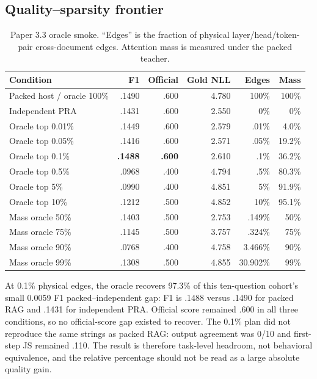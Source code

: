\documentclass[11pt]{article}
\begin{document}
\subsection{Quality--sparsity frontier}

\begin{table}[ht]
\centering
\small
\caption{Paper 3.3 oracle smoke. ``Edges'' is the fraction of physical
layer/head/token-pair cross-document edges. Attention mass is measured under
the packed teacher.}
\label{tab:oracle-frontier}
\begin{tabular}{lrrrrr}
\toprule
Condition & F1 & Official & Gold NLL & Edges & Mass \\
\midrule
Packed host / oracle 100\% & .1490 & .600 & 4.780 & 100\% & 100\% \\
Independent PRA & .1431 & .600 & 2.550 & 0\% & 0\% \\
Oracle top 0.01\% & .1449 & .600 & 2.579 & .01\% & 4.0\% \\
Oracle top 0.05\% & .1416 & .600 & 2.571 & .05\% & 19.2\% \\
Oracle top 0.1\% & \textbf{.1488} & \textbf{.600} & 2.610 & .1\% & 36.2\% \\
Oracle top 0.5\% & .0968 & .400 & 4.794 & .5\% & 80.3\% \\
Oracle top 5\% & .0990 & .400 & 4.851 & 5\% & 91.9\% \\
Oracle top 10\% & .1212 & .500 & 4.852 & 10\% & 95.1\% \\
\midrule
Mass oracle 50\% & .1403 & .500 & 2.753 & .149\% & 50\% \\
Mass oracle 75\% & .1145 & .500 & 3.757 & .324\% & 75\% \\
Mass oracle 90\% & .0768 & .400 & 4.758 & 3.466\% & 90\% \\
Mass oracle 99\% & .1308 & .500 & 4.855 & 30.902\% & 99\% \\
\bottomrule
\end{tabular}
\end{table}

At 0.1\% physical edges, the oracle recovers 97.3\% of this ten-question
cohort's small 0.0059 F1 packed--independent gap: F1 is .1488 versus .1490 for
packed RAG and .1431 for independent PRA. Official score remained .600 in all
three conditions, so no official-score gap existed to recover. The 0.1\% plan
did not reproduce the same strings as packed RAG: output agreement was 0/10 and
first-step JS remained .110. The result is therefore task-level headroom, not
behavioral equivalence, and the relative percentage should not be read as a
large absolute quality gain.
\end{document}
